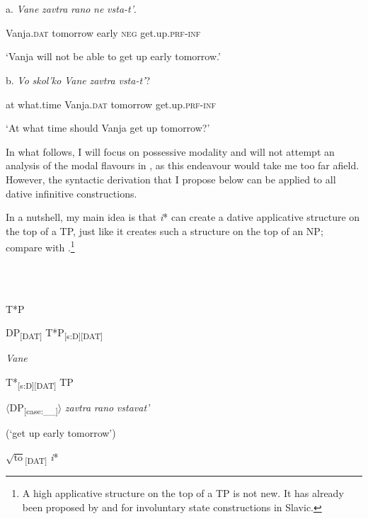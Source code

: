 \documentclass[output=paper,colorlinks,citecolor=brown]{./langscibook}
\begin{document}
\ea%
    \label{ex:tsedryk:30}
    \gll\\
        \\
    \glt
    \z

          a.  \textit{Vane}\textbf{ }          \textit{zavtra}       \textit{rano}   \textit{ne}     \textit{vsta-t’}.

    Vanja.\textsc{dat}  tomorrow  early  \textsc{neg}    get.up.\textsc{prf-inf}

  ‘Vanja will not be able to get up early tomorrow.’ 

  b.    \textit{Vo}    \textit{skol’ko}       \textit{Vane}           \textit{zavtra}         \textit{vsta-t’}?

    at    what.time    Vanja.\textsc{dat}  tomorrow    get.up.\textsc{prf-inf}

  ‘At what time should Vanja get up tomorrow?’ 

In what follows, I will focus on possessive modality and will not attempt an analysis of the modal flavours in , as this endeavour would take me too far afield. However, the syntactic derivation that I propose below can be applied to all dative infinitive constructions.  

In a nutshell, my main idea is that \textit{i}* can create a dative applicative structure on the top of a TP, just like it creates such a structure on the top of an NP; compare  with .\footnote{A high applicative structure on the top of a TP is not new. It has already been proposed by \citet{Rivero2009} and \citet{RiveroArregui2012} for involuntary state constructions in Slavic.}      

\ea%
    \label{ex:tsedryk:31}
    \gll\\
        \\
    \glt
    \z

          T*P

  DP\textsubscript{[DAT]}  T*P\textsubscript{[s:D][DAT]}

  \textit{Vane}

    T*\textsubscript{[s:D][DAT]}  TP

      ${\langle}$DP\textsubscript{[case:\_\_]}${\rangle}$ \textit{zavtra} \textit{rano} \textit{vstavat’} 

      (‘get up early tomorrow’)  

   $\sqrt{\text{to}}$\textsubscript{[DAT]}  \textit{i}*        
\end{document}
